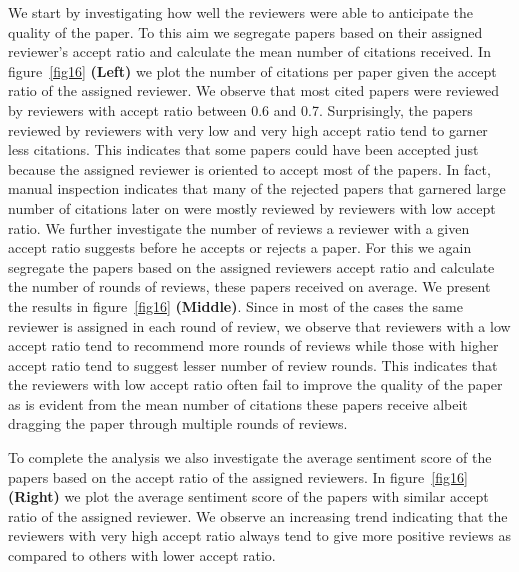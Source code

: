 We start by investigating how well the reviewers were able to anticipate the quality of the paper. To this aim we segregate papers based on their assigned reviewer's accept ratio and calculate the mean number of citations received. In figure~\ref{fig16} {\bf (Left)} we plot the number of citations per paper given the accept ratio of the assigned reviewer. We observe that most cited papers were reviewed by reviewers with accept ratio between 0.6 and 0.7. Surprisingly, the papers reviewed by reviewers with very low and very high accept ratio tend to garner less citations. This indicates that some papers could have been accepted just because the assigned reviewer is oriented to accept most of the papers. In fact, manual inspection indicates that many of the rejected papers that garnered large number of citations later on were mostly reviewed by reviewers with low accept ratio. We further investigate the number of reviews a reviewer with a given accept ratio suggests before he accepts or rejects a paper. For this we again segregate the papers based on the assigned reviewers accept ratio and calculate the number of rounds of reviews, these papers received on average. We present the results in figure~\ref{fig16} {\bf (Middle)}. Since in most of the cases the same reviewer is assigned in each round of review, we observe that reviewers with a low accept ratio tend to recommend more rounds of reviews while those with higher accept ratio tend to suggest lesser number of review rounds. This indicates that the reviewers with low accept ratio often fail to improve the quality of the paper as is evident from the mean number of citations these papers receive albeit dragging the paper through multiple rounds of reviews.


To complete the analysis we also investigate the average sentiment score of the papers based on the accept ratio of the assigned reviewers. In figure~\ref{fig16} {\bf (Right)} we plot the average sentiment score of the papers with similar accept ratio of the assigned reviewer. We observe an increasing trend indicating that the reviewers with very high accept ratio always tend to give more positive reviews as compared to others with lower accept ratio. 


